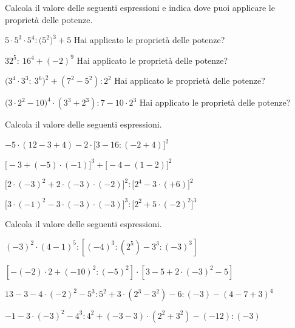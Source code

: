 \begin{esercizio}[\Ast]
Calcola il valore delle seguenti espressioni e indica dove puoi applicare le 
proprietà delle potenze.
\TabPositions{5.5cm}
\begin{enumeratea}
 \item $5\cdot 5^3\cdot 5^4: \big(5^2\big)^3 +5$ \tab Hai applicato le proprietà 
delle potenze?\enspace\dotfill
 \item $32^5:~16^4 +(-2)^9$ \tab Hai applicato le proprietà delle 
potenze?\enspace\dotfill
 \item $\big(3^4\cdot 3^3:~3^6\big)^2 +(7^2-5^2):2^2$ \tab Hai applicato le 
proprietà delle potenze?\enspace\dotfill
 \item $\big(3\cdot 2^2 -10\big)^4\cdot (3^3+2^3):7-10\cdot 2^3$ \tab Hai 
applicato le proprietà delle potenze?\enspace\dotfill
\end{enumeratea}
\end{esercizio}

\begin{esercizio}[\Ast]
Calcola il valore delle seguenti espressioni.
 \begin{enumeratea}
 \item $-5\cdot(12-3+4)-2\cdot\big[3-16:(-2+4)\big]^2$
 \item $\big[-3+(-5)\cdot(-1)\big]^3+\big[-4-(1-2)\big]^2$
 \item $\big[2\cdot(-3)^2+2\cdot(-3)\cdot(-2)\big]^2:\big[2^4-3\cdot(+6)\big]^2$
 \item 
$\big[3\cdot(-1)^2-3\cdot(-3)\cdot(-3)\big]^3:\big[2^2+5\cdot(-2)^2\big]^3$
 \end{enumeratea}
\end{esercizio}

\begin{esercizio}[\Ast]
Calcola il valore delle seguenti espressioni.
 \begin{enumeratea}
 \item $(-3)^2\cdot(4-1)^5:[(-4)^3:(2^5)-3^3:(-3)^3]$
 \item $[-(-2)\cdot2+(-10)^2:(-5)^2]\cdot[3-5+2\cdot(-3)^2-5]$
 \item $13-3-4\cdot(-2)^2-5^3:5^2+3\cdot(2^3-3^2)-6:(-3)-(4-7+3)^4$
 \item $-1-3\cdot(-3)^2-4^3:4^2+(-3-3)\cdot(2^2+3^2)-(-12):(-3)$
 \end{enumeratea}
\end{esercizio}

